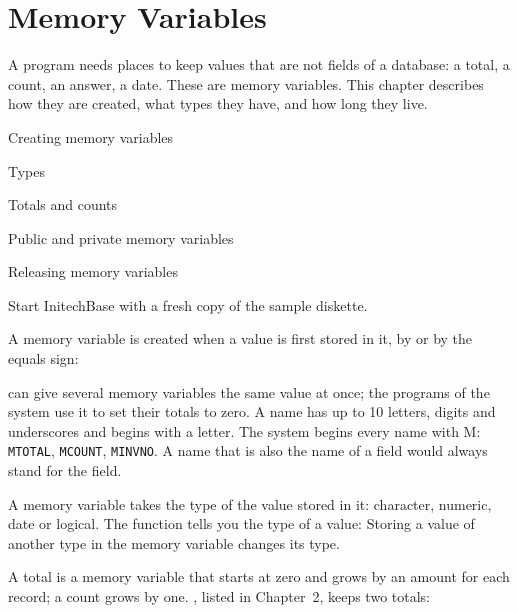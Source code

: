 \chapter{Memory Variables}
A program needs places to keep values that are not fields of a database: a
total, a count, an answer, a date.  These are memory variables.  This chapter
describes how they are created, what types they have, and how long they live.

\begin{ChapterCovers}
\item Creating memory variables
\item Types
\item Totals and counts
\item Public and private memory variables
\item Releasing memory variables
\end{ChapterCovers}

Start InitechBase with a fresh copy of the sample diskette.

A memory variable is created when a value is first stored in it, by
 or by the equals sign:


 can give several memory variables the same value at once; the
programs of the system use it to set their totals to zero.  A name has up to 10
letters, digits and underscores and begins with a letter.  The system begins
every name with M: \texttt{MTOTAL}, \texttt{MCOUNT}, \texttt{MINVNO}.  A name that
is also the name of a field would always stand for the field.

A memory variable takes the type of the value stored in it: character,
numeric, date or logical.  The function  tells you the type of a
value:
Storing a value of another type in the memory variable changes its type.

A total is a memory variable that starts at zero and grows by an amount for
each record; a count grows by one.  , listed in Chapter~2,
keeps two totals:

